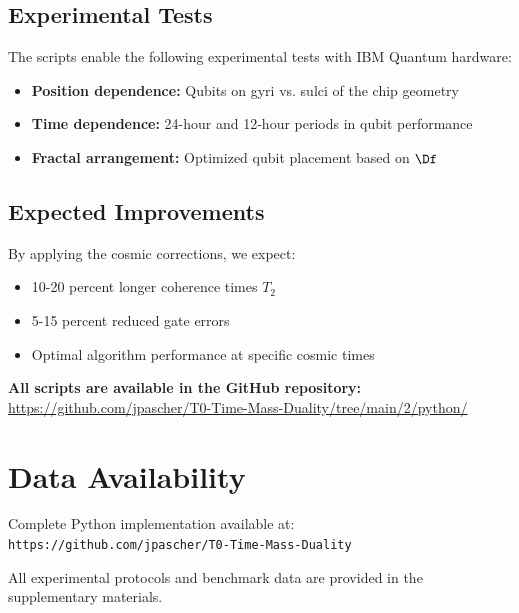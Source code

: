\subsection{Experimental Tests}

The scripts enable the following experimental tests with IBM Quantum hardware:

\begin{itemize}
	\item \textbf{Position dependence:} Qubits on gyri vs. sulci of the chip geometry
	\item \textbf{Time dependence:} 24-hour and 12-hour periods in qubit performance
	\item \textbf{Fractal arrangement:} Optimized qubit placement based on $\Df$
\end{itemize}

\subsection{Expected Improvements}

By applying the cosmic corrections, we expect:

\begin{itemize}
	\item 10-20 percent longer coherence times $T_2$
	\item 5-15 percent reduced gate errors
	\item Optimal algorithm performance at specific cosmic times
\end{itemize}

\textbf{All scripts are available in the GitHub repository:} \\
\url{https://github.com/jpascher/T0-Time-Mass-Duality/tree/main/2/python/}

\section*{Data Availability}

Complete Python implementation available at: \\
\texttt{https://github.com/jpascher/T0-Time-Mass-Duality}

All experimental protocols and benchmark data are provided in the supplementary materials.


